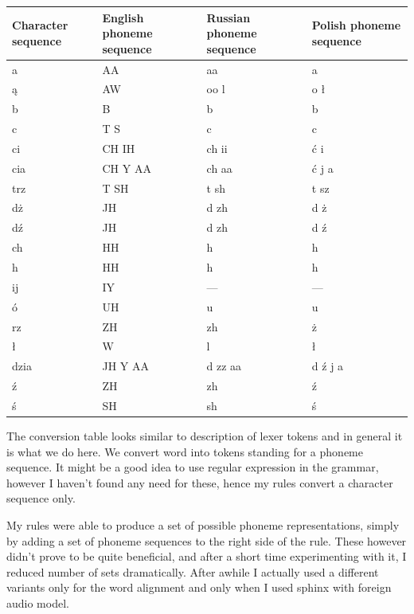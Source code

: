 \documentclass[12pt,a4paper,english]{article}
\begin{document}
\begin{center}
\begin{tabular}{| p{3.5cm} | p{3.5cm} | p{3.5cm} | p{3.3cm} |}
\hline
\rowcolor[gray]{0.8}
Character sequence & English phoneme sequence & Russian phoneme sequence & Polish phoneme sequence
\\ \hline
a & AA & aa & a
\\ \hline
ą & AW & oo l & o ł \footnotemark
\\ \hline
b & B & b & b
\\ \hline
c & T S & c & c
\\ \hline
ci & CH IH & ch ii & ć i
\\ \hline
cia & CH Y AA & ch aa & ć j a 
\\ \hline
trz & T SH & t sh & t sz
\\ \hline
dż & JH & d zh & d ż
\\ \hline
dź & JH & d zh & d ź
\\ \hline
ch & HH & h & h
\\ \hline
h & HH & h & h
\\ \hline
ij & IY & --- & ---
\\ \hline
ó & UH & u & u
\\ \hline
rz & ZH & zh & ż
\\ \hline
ł & W & l & ł
\\ \hline
dzia & JH Y AA & d zz aa & d ź j a
\\ \hline
ź & ZH & zh & ź
\\ \hline
ś & SH & sh & ś
\\ \hline
\end{tabular}
\end{center}

\newpage

The conversion table looks similar to description of lexer tokens and in general it is what we do here. We convert word into tokens standing for a phoneme sequence. It might be a good idea to use regular expression in the grammar, however I haven't found any need for these, hence my rules convert a character sequence only. \newline

My rules were able to produce a set of possible phoneme representations, simply by adding a set of phoneme sequences to the right side of the rule. These however didn't prove to be quite beneficial, and after a short time experimenting with it, I reduced number of sets dramatically. After awhile I actually used a different variants only for the word alignment and only when I used sphinx with foreign audio model. \newline
\end{document}
